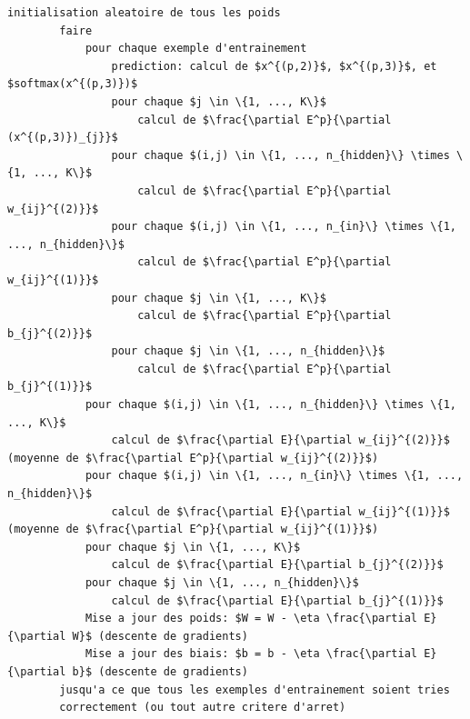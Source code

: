 \documentclass[a4paper,11pt,oneside,roman]{article}
\begin{document}
    \begin{lstlisting}[mathescape]
        initialisation aleatoire de tous les poids
        faire
            pour chaque exemple d'entrainement
                prediction: calcul de $x^{(p,2)}$, $x^{(p,3)}$, et $softmax(x^{(p,3)})$
                pour chaque $j \in \{1, ..., K\}$
                    calcul de $\frac{\partial E^p}{\partial (x^{(p,3)})_{j}}$
                pour chaque $(i,j) \in \{1, ..., n_{hidden}\} \times \{1, ..., K\}$
                    calcul de $\frac{\partial E^p}{\partial w_{ij}^{(2)}}$
                pour chaque $(i,j) \in \{1, ..., n_{in}\} \times \{1, ..., n_{hidden}\}$
                    calcul de $\frac{\partial E^p}{\partial w_{ij}^{(1)}}$
                pour chaque $j \in \{1, ..., K\}$
                    calcul de $\frac{\partial E^p}{\partial b_{j}^{(2)}}$
                pour chaque $j \in \{1, ..., n_{hidden}\}$
                    calcul de $\frac{\partial E^p}{\partial b_{j}^{(1)}}$
            pour chaque $(i,j) \in \{1, ..., n_{hidden}\} \times \{1, ..., K\}$
                calcul de $\frac{\partial E}{\partial w_{ij}^{(2)}}$ (moyenne de $\frac{\partial E^p}{\partial w_{ij}^{(2)}}$)
            pour chaque $(i,j) \in \{1, ..., n_{in}\} \times \{1, ..., n_{hidden}\}$
                calcul de $\frac{\partial E}{\partial w_{ij}^{(1)}}$ (moyenne de $\frac{\partial E^p}{\partial w_{ij}^{(1)}}$)
            pour chaque $j \in \{1, ..., K\}$
                calcul de $\frac{\partial E}{\partial b_{j}^{(2)}}$
            pour chaque $j \in \{1, ..., n_{hidden}\}$
                calcul de $\frac{\partial E}{\partial b_{j}^{(1)}}$
            Mise a jour des poids: $W = W - \eta \frac{\partial E}{\partial W}$ (descente de gradients)
            Mise a jour des biais: $b = b - \eta \frac{\partial E}{\partial b}$ (descente de gradients)
        jusqu'a ce que tous les exemples d'entrainement soient tries 
        correctement (ou tout autre critere d'arret)
    \end{lstlisting}

    
    

    
\end{document}
